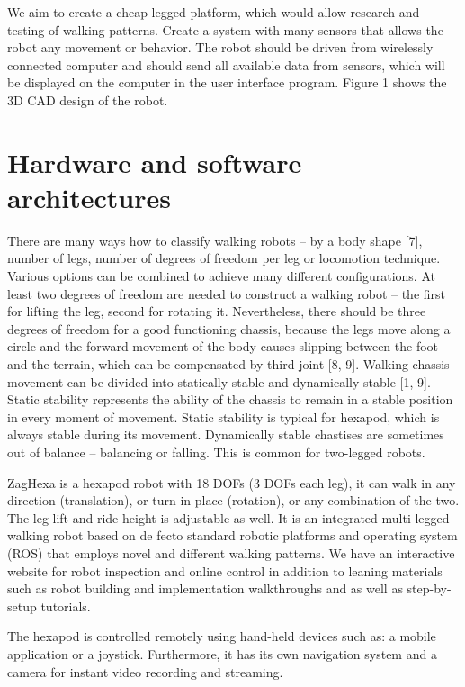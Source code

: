 \documentclass[conference]{IEEEtran}
\begin{document}
We aim to create a cheap legged platform, which would allow research and testing of walking patterns. Create a system with many sensors that allows the robot any movement or behavior. The robot should be driven from wirelessly connected computer and should send all available data from sensors, which will be displayed on the computer in the user interface program. Figure 1 shows the 3D CAD design of the robot.

\section{Hardware and software architectures}
There are many ways how to classify walking robots – by a body shape [7], number of legs, number of degrees of freedom per leg or locomotion technique. Various options can be combined to achieve many different configurations. At least two degrees of freedom are needed to construct a walking robot – the first for lifting the leg, second for rotating it. Nevertheless, there should be three degrees of freedom for a good functioning chassis, because the legs move along a circle and the forward movement of the body causes slipping between the foot and the terrain, which can be compensated by third joint [8, 9]. Walking chassis movement can be divided into statically stable and dynamically stable [1, 9]. Static stability represents the ability of the chassis to remain in a stable position in every moment of movement. Static stability is typical for hexapod, which is always stable during its movement. Dynamically stable chastises are sometimes out of balance – balancing or falling. This is common for two-legged robots.

ZagHexa is a hexapod robot with 18 DOFs (3 DOFs each leg), it can walk in any direction (translation), or turn in place (rotation), or any combination of the two. The leg lift and ride height is adjustable as well. 
It is an integrated multi-legged walking robot based on de fecto standard robotic platforms and operating system (ROS) that employs novel and different walking patterns.
We have an interactive website for robot inspection and online control in addition to leaning materials such as robot building and implementation walkthroughs and as well as step-by-setup tutorials.


The hexapod is controlled remotely using hand-held devices such as: a mobile application or a joystick. Furthermore, it has its own navigation system and a camera for instant video recording and streaming.
\end{document}
